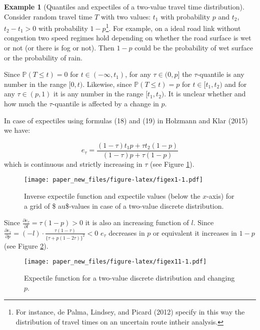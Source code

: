 \documentclass[
]{article}
\theoremstyle{definition}
\theoremstyle{definition}
\newtheorem{example}{Example}[section]
\theoremstyle{definition}
\theoremstyle{definition}
\theoremstyle{remark}
\begin{document}
\begin{example}[Quantiles and expectiles of a two-value travel time distribution]
\protect\hypertarget{exm:ddqande}{}\label{exm:ddqande}Consider random travel time \(T\) with two values: \(t_1\) with probability \(p\) and \(t_2\), \(t_2-t_1>0\) with probability \(1-p\)\footnote{For instance, de Palma, Lindsey, and Picard (2012) specify in this way the distribution of travel times on an uncertain route intheir analysis.}. For example, on a ideal road link without congestion two speed regimes hold depending on whether the road surface is wet or not (or there is fog or not). Then \(1-p\) could be the probability of wet surface or the probability of rain.

Since \(\mathbb P(T\leq t) = 0\) for \(t\in(-\infty,t_1)\), for any \(\tau\in (0,p]\) the \(\tau\)-quantile is any number in the range \([0,t)\). Likewise, since \(\mathbb P(T\leq t) = p\) for \(t\in[t_1,t_2)\) and for any \(\tau \in(p,1)\) it is any number in the range \([t_1,t_2)\). It is unclear whether and how much the \(\tau\)-quantile is affected by a change in \(p\).

In case of expectiles using formulas (18) and (19) in Holzmann and Klar (2015) we have:

\[e_\tau = \frac{(1-\tau)t_1p+ \tau t_2(1-p)}{(1-\tau)p + \tau(1-p)}\]
which is continuous and strictly increasing in \(\tau\) (see Figure \ref{fig:figex1}).

\begin{figure}
\centering
\texttt{[image: paper\_new\_files/figure-latex/figex1-1.pdf]}
\caption{\label{fig:figex1}Inverse expectile function and expectile values (below the \(x\)-axis) for a grid of \$ au\$-values in case of a two-value discrete distribution.}
\end{figure}

Since \(\frac{\partial e_\tau}{\partial l} = \tau(1-p)>0\) it is also an increasing function of \(l\). Since \(\frac{\partial e_\tau}{\partial p} =(-l)\cdot \frac{ \tau (1-\tau)} {\{\tau+p (1-2\tau )\}^2} <0\) \(e_\tau\) decreases in \(p\) or equivalent it increases in \(1-p\) (see Figure \ref{fig:figex11}).
\end{example}

\begin{figure}
\centering
\texttt{[image: paper\_new\_files/figure-latex/figex11-1.pdf]}
\caption{\label{fig:figex11}Expectile function for a two-value discrete distribution and changing \(p\).}
\end{figure}
\end{document}
